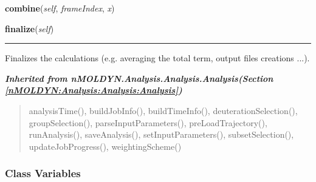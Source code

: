 \hspace{.8\funcindent}\begin{boxedminipage}{\funcwidth}

    \raggedright \textbf{combine}(\textit{self}, \textit{frameIndex}, \textit{x})

\setlength{\parskip}{2ex}
\setlength{\parskip}{1ex}
    \end{boxedminipage}

    \label{nMOLDYN:Analysis:NMR:OrderParameterContactModel:finalize}

    \vspace{0.5ex}

\hspace{.8\funcindent}\begin{boxedminipage}{\funcwidth}

    \raggedright \textbf{finalize}(\textit{self})

    \vspace{-1.5ex}

    \rule{\textwidth}{0.5\fboxrule}
\setlength{\parskip}{2ex}
    Finalizes the calculations (e.g. averaging the total term, output files
    creations ...).

\setlength{\parskip}{1ex}
    \end{boxedminipage}


\large{\textbf{\textit{Inherited from nMOLDYN.Analysis.Analysis.Analysis\textit{(Section \ref{nMOLDYN:Analysis:Analysis:Analysis})}}}}

\begin{quote}
analysisTime(), buildJobInfo(), buildTimeInfo(), deuterationSelection(), groupSelection(), parseInputParameters(), preLoadTrajectory(), runAnalysis(), saveAnalysis(), setInputParameters(), subsetSelection(), updateJobProgress(), weightingScheme()
\end{quote}


  \subsubsection{Class Variables}

